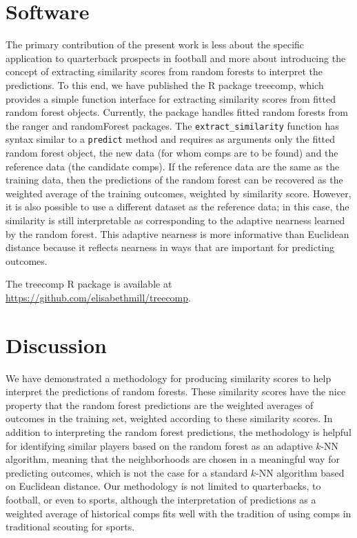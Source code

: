 \documentclass{article}
\begin{document}
\section{Software}
\label{sec:software}

The primary contribution of the present work is less about the specific application to quarterback prospects in football and more about introducing the concept of extracting similarity scores from random forests to interpret the predictions. To this end, we have published the R package treecomp, which provides a simple function interface for extracting similarity scores from fitted random forest objects. Currently, the package handles fitted random forests from the ranger and randomForest packages. The \texttt{extract\_similarity} function has syntax similar to a \texttt{predict} method and requires as arguments only the fitted random forest object, the new data (for whom comps are to be found) and the reference data (the candidate comps). If the reference data are the same as the training data, then the predictions of the random forest can be recovered as the weighted average of the training outcomes, weighted by similarity score. However, it is also possible to use a different dataset as the reference data; in this case, the similarity is still interpretable as corresponding to the adaptive nearness learned by the random forest. This adaptive nearness is more informative than Euclidean distance because it reflects nearness in ways that are important for predicting outcomes.

The treecomp R package is available at \url{https://github.com/elisabethmill/treecomp}.

\section{Discussion}
\label{sec:discussion}

We have demonstrated a methodology for producing similarity scores to help interpret the predictions of random forests. These similarity scores have the nice property that the random forest predictions are the weighted averages of outcomes in the training set, weighted according to these similarity scores. In addition to interpreting the random forest predictions, the methodology is helpful for identifying similar players based on the random forest as an adaptive $k$-NN algorithm, meaning that the neighborhoods are chosen in a meaningful way for predicting outcomes, which is not the case for a standard $k$-NN algorithm based on Euclidean distance. Our methodology is not limited to quarterbacks, to football, or even to sports, although the interpretation of predictions as a weighted average of historical comps fits well with the tradition of using comps in traditional scouting for sports.
\end{document}
